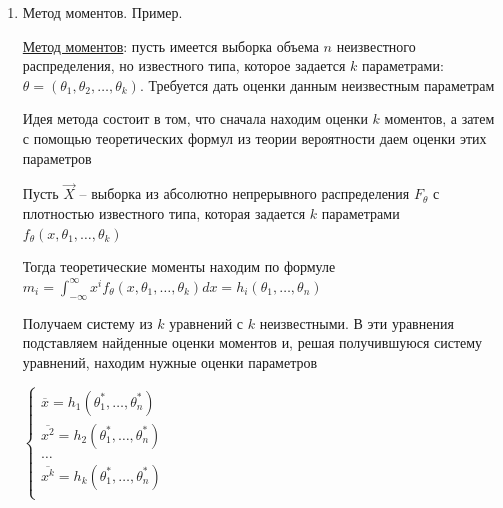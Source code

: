 \begin{enumerate}
\begin{MyTheorem}
        1) $E \overline{x} = a$
    
        2) $\overline{x} \overset{p}{\longrightarrow} a$ при $n \to \infty$
    \end{MyTheorem}
    
    \begin{MyTheorem}
        \Ths Выборочный $k$-ый момент является состоятельной несмещенной оценкой теоретического $k$-ого момента
    
        1) $E \overline{X^k} = E X^k$
    
        2) $\overline{X^k} \overset{p}{\longrightarrow} X^k$
    \end{MyTheorem}
    
    \begin{MyTheorem}
        \Ths Выборочной дисперсией $D^*$ и $S^2$ являются состоятельными оценками теоретической дисперсией, при этом $D^*$ -- смещенная оценка, а $S^2$ -- несмещенная оценка
    \end{MyTheorem}

    \item Метод моментов. Пример.

    \hyperlink{method_of_moments}{Метод моментов}: пусть имеется выборка объема $n$ неизвестного распределения, но известного типа,
    которое задается $k$ параметрами: $\theta = (\theta_1, \theta_2, \dots, \theta_k)$. Требуется дать оценки данным
    неизвестным параметрам

    Идея метода состоит в том, что сначала находим оценки $k$ моментов, а затем с помощью теоретических формул
    из теории вероятности даем оценки этих параметров

    Пусть $\vec{X}$ -- выборка из абсолютно непрерывного распределения $F_\theta$ с плотностью известного типа, 
    которая задается $k$ параметрами $f_\theta (x, \theta_1, \dots, \theta_k)$

    Тогда теоретические моменты находим по формуле $m_i = \int_{-\infty}^{\infty} x^i f_\theta (x, \theta_1, \dots, \theta_k) dx = h_i(\theta_1, \dots, \theta_n)$

    Получаем систему из $k$ уравнений с $k$ неизвестными. В эти уравнения подставляем найденные оценки
    моментов и, решая получившуюся систему уравнений, находим нужные оценки параметров

    $\begin{cases}
        \overline{x} = h_1(\theta_1^*, \dots, \theta_n^*) \\ 
        \overline{x^2} = h_2(\theta_1^*, \dots, \theta_n^*) \\ 
        \dots \\
        \overline{x^k} = h_k(\theta_1^*, \dots, \theta_n^*) \\ 
    \end{cases}$


\end{enumerate}
